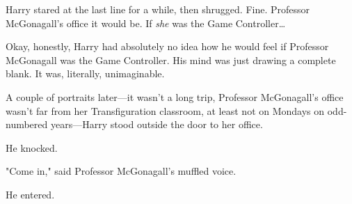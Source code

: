 Harry stared at the last line for a while, then shrugged. Fine. Professor
McGonagall's office it would be. If \emph{she} was the Game Controller{\ldots}

Okay, honestly, Harry had absolutely no idea how he would feel if Professor
McGonagall was the Game Controller. His mind was just drawing a complete blank.
It was, literally, unimaginable.

A couple of portraits later---it wasn't a long trip, Professor McGonagall's
office wasn't far from her Transfiguration classroom, at least not on Mondays
on odd-numbered years---Harry stood outside the door to her office.

He knocked.

"Come in," said Professor McGonagall's muffled voice.

He entered.
